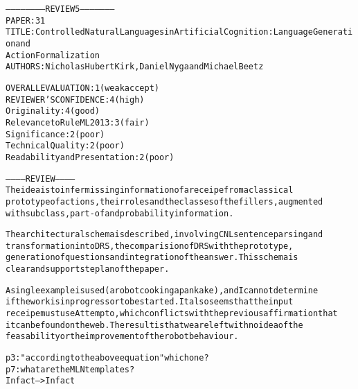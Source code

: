 \documentclass[oribibl]{llncs}
\begin{document}
\begin{alltt}
----------------------- REVIEW 5 ---------------------
PAPER: 31
TITLE: Controlled Natural Languages in Artificial Cognition: Language Generation and 
Action Formalization
AUTHORS: Nicholas Hubert Kirk, Daniel Nyga and Michael Beetz

OVERALL EVALUATION: 1 (weak accept)
REVIEWER'S CONFIDENCE: 4 (high)
Originality: 4 (good)
Relevance to RuleML 2013: 3 (fair)
Significance: 2 (poor)
Technical Quality: 2 (poor)
Readability and Presentation: 2 (poor)

----------- REVIEW -----------
The idea is to infer missing information of a receipe from a classical
prototype of actions, their roles and the classes of the fillers, augmented
with subclass, part-of and probability information.

The architectural schema is described, involving CNL sentence parsing and
transformation into DRS, the comparision of DRS with the prototype,
generation of questions and integration of the answer. This schema is
clear and supports te plan of the paper.

A single example is used (a robot cooking a pankake), and I cannot determine
if the work is in progress or to be started. It also seems that the input
receipe must use Attempto, which conflicts with the previous affirmation that
it can be found on the web. The result is that we are left with no idea of the
feasability or the improvement of the robot behaviour.

p3:" according to the above equation"  which one ?
p7: what are the MLN templates ?
Infact --> In fact

\end{alltt}
\end{document}
